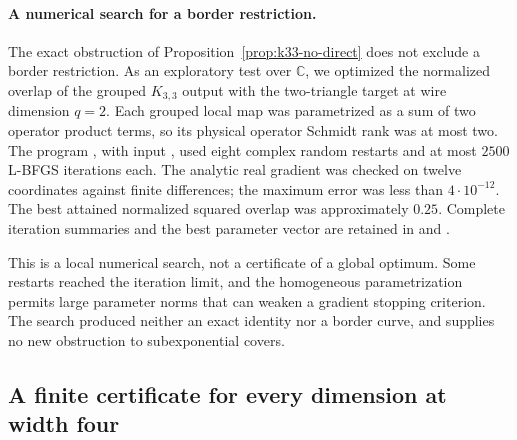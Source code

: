 \paragraph{A numerical search for a border restriction.}
The exact obstruction of Proposition~\ref{prop:k33-no-direct}
does not exclude a border restriction.  As an exploratory
test over $\mathbb C$, we optimized the normalized overlap
of the grouped $K_{3,3}$ output with the two-triangle target
at wire dimension $q=2$.  Each grouped local map was
parametrized as a sum of two operator product terms, so its
physical operator Schmidt rank was at most two.  The
program , with input
, used eight complex
random restarts and at most $2500$ L-BFGS iterations each.
The analytic real gradient was checked on twelve coordinates
against finite differences; the maximum error was less than
$4\cdot10^{-12}$.  The best attained normalized squared
overlap was approximately $0.25$.  Complete iteration
summaries and the best parameter vector are retained in
 and
.

This is a local numerical search, not a certificate of a
global optimum.  Some restarts reached the iteration limit,
and the homogeneous parametrization permits large parameter
norms that can weaken a gradient stopping criterion.  The
search produced neither an exact identity nor a border curve,
and supplies no new obstruction to subexponential covers.

\subsection{A finite certificate for every dimension at width four}

